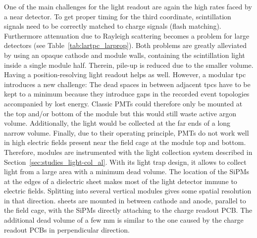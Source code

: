 One of the main challenges for the light readout are again the high rates faced by a near detector.
To get proper timing for the third coordinate, scintillation signals need to be correctly matched to charge signals (flash matching).
Furthermore attenuation due to Rayleigh scattering becomes a problem for large detectors (see Table~\ref{tab:lartpc_larprop}).
Both problems are greatly alleviated by using an opaque cathode and module walls, containing the scintillation light inside a single module half.
Therein, pile-up is reduced due to the smaller volume.
Having a position-resolving light readout helps as well.
However, a modular \gls{tpc} introduces a new challenge: The dead spaces in between adjacent \glspl{tpc} have to be kept to a minimum because they introduce gaps in the recorded event topologies accompanied by lost energy.
Classic PMTs could therefore only be mounted at the top and/or bottom of the module but this would still waste active argon volume.
Additionally, the light would be collected at the far ends of a long narrow volume.
Finally, due to their operating principle, PMTs do not work well in high electric fields present near the field cage at the module top and bottom.
Therefore, \AC{} modules are instrumented with the \AL{} light collection system described in Section~\ref{sec:studies_light-col_al}.
With its light trap design, it  allows to collect light from a large area with a minimum dead volume.
The location of the SiPMs at the edges of a dielectric sheet makes most of the light detector immune to electric fields.
Splitting \AL{} into several vertical modules gives some spatial resolution in that direction.
\AL{} sheets are mounted in between cathode and anode, parallel to the field cage, with the SiPMs directly attaching to the charge readout PCB.
The additional dead volume of a few \si{\milli\metre} is similar to the one caused by the charge readout PCBs in perpendicular direction.